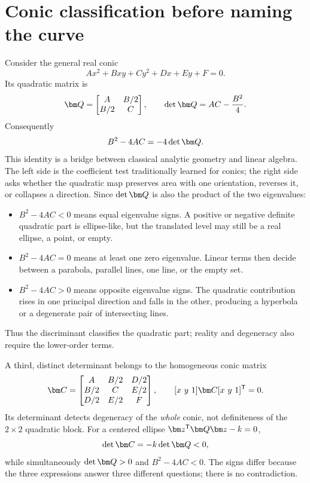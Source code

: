 \section{Conic classification before naming the curve}

Consider the general real conic
\begin{equation}
 Ax^2+Bxy+Cy^2+Dx+Ey+F=0.\label{eq:general-conic}
\end{equation}
Its quadratic matrix is
\begin{equation}
 \matr Q=\begin{bmatrix}A&B/2\\B/2&C\end{bmatrix},\qquad
 \det\matr Q=AC-\frac{B^2}{4}.
\end{equation}
Consequently
\begin{equation}
 B^2-4AC=-4\det\matr Q.\label{eq:disc-det}
\end{equation}
This identity is a bridge between classical analytic geometry and linear
algebra.  The left side is the coefficient test traditionally learned for
conics; the right side asks whether the quadratic map preserves area with one
orientation, reverses it, or collapses a direction.  Since
$\det\matr Q$ is also the product of the two eigenvalues:
\begin{itemize}
 \item $B^2-4AC<0$ means equal eigenvalue signs.  A positive or negative
       definite quadratic part is ellipse-like, but the translated level may
       still be a real ellipse, a point, or empty.
 \item $B^2-4AC=0$ means at least one zero eigenvalue.  Linear terms then decide
       between a parabola, parallel lines, one line, or the empty set.
 \item $B^2-4AC>0$ means opposite eigenvalue signs.  The quadratic contribution
       rises in one principal direction and falls in the other, producing a
       hyperbola or a degenerate pair of intersecting lines.
\end{itemize}
Thus the discriminant classifies the quadratic part; reality and degeneracy
also require the lower-order terms.

A third, distinct determinant belongs to the homogeneous conic matrix
\begin{equation}
 \matr C=\begin{bmatrix}
 A&B/2&D/2\\ B/2&C&E/2\\ D/2&E/2&F
 \end{bmatrix},\qquad
 [x\ y\ 1]\matr C[x\ y\ 1]\trans=0.
\end{equation}
Its determinant detects degeneracy of the \emph{whole} conic, not definiteness
of the $2\times2$ quadratic block.  For a centered ellipse
$\vect z\trans\matr Q\vect z-k=0$,
\begin{equation}
 \det\matr C=-k\det\matr Q<0,
\end{equation}
while simultaneously $\det\matr Q>0$ and $B^2-4AC<0$.  The signs differ
because the three expressions answer three different questions; there is no
contradiction.

